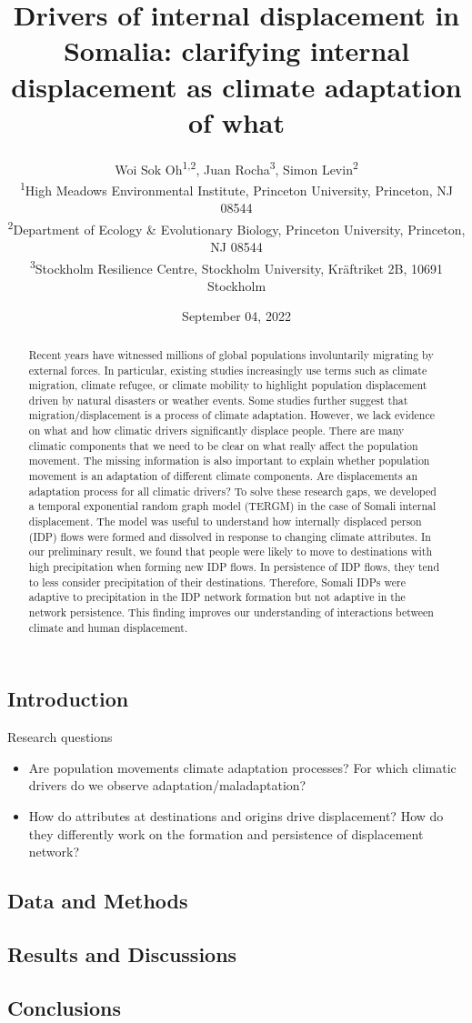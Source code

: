 \documentclass[10pt,]{article}
\title{Drivers of internal displacement in Somalia: clarifying internal displacement as climate adaptation of what}
\author{Woi Sok Oh\textsuperscript{1,2}, Juan Rocha\textsuperscript{3}, Simon Levin\textsuperscript{2}\\
\small \textsuperscript{1}High Meadows Environmental Institute, Princeton University, Princeton, NJ 08544\\
\small \textsuperscript{2}Department of Ecology \& Evolutionary Biology, Princeton University, Princeton, NJ 08544\\
\small \textsuperscript{3}Stockholm Resilience Centre, Stockholm University, Kräftriket 2B, 10691 Stockholm}
\date{September 04, 2022}
\providecommand{\tightlist}{%
  \setlength{\itemsep}{0pt}\setlength{\parskip}{0pt}}
\begin{document}
\maketitle
\begin{abstract}
Recent years have witnessed millions of global populations involuntarily migrating by external forces. In particular, existing studies increasingly use terms such as climate migration, climate refugee, or climate mobility to highlight population displacement driven by natural disasters or weather events. Some studies further suggest that migration/displacement is a process of climate adaptation. However, we lack evidence on what and how climatic drivers significantly displace people. There are many climatic components that we need to be clear on what really affect the population movement. The missing information is also important to explain whether population movement is an adaptation of different climate components. Are displacements an adaptation process for all climatic drivers? To solve these research gaps, we developed a temporal exponential random graph model (TERGM) in the case of Somali internal displacement. The model was useful to understand how internally displaced person (IDP) flows were formed and dissolved in response to changing climate attributes. In our preliminary result, we found that people were likely to move to destinations with high precipitation when forming new IDP flows. In persistence of IDP flows, they tend to less consider precipitation of their destinations. Therefore, Somali IDPs were adaptive to precipitation in the IDP network formation but not adaptive in the network persistence. This finding improves our understanding of interactions between climate and human displacement.
\end{abstract}

\hypertarget{introduction}{%
\subsection{Introduction}\label{introduction}}

Research questions

\begin{itemize}
\tightlist
\item
  Are population movements climate adaptation processes? For which climatic drivers do we observe adaptation/maladaptation?
\item
  How do attributes at destinations and origins drive displacement? How do they differently work on the formation and persistence of displacement network?
\end{itemize}

\hypertarget{data-and-methods}{%
\subsection{Data and Methods}\label{data-and-methods}}

\hypertarget{results-and-discussions}{%
\subsection{Results and Discussions}\label{results-and-discussions}}

\hypertarget{conclusions}{%
\subsection{Conclusions}\label{conclusions}}
\end{document}
